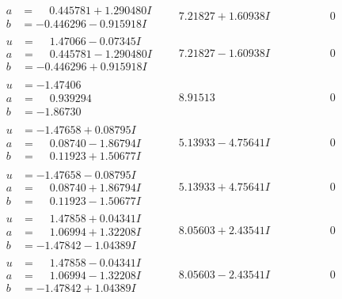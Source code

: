 \documentclass[1p]{elsarticle_modified}
\theoremstyle{definition}
\begin{document}
$$\begin{array}{c|c|c}
\begin{aligned}
a &= \phantom{-}0.445781 + 1.290480 I \\
b &= -0.446296 - 0.915918 I\end{aligned}
 & \phantom{-}7.21827 + 1.60938 I & \phantom{-0.000000 } 0 \\ \hline\begin{aligned}
u &= \phantom{-}1.47066 - 0.07345 I \\
a &= \phantom{-}0.445781 - 1.290480 I \\
b &= -0.446296 + 0.915918 I\end{aligned}
 & \phantom{-}7.21827 - 1.60938 I & \phantom{-0.000000 } 0 \\ \hline\begin{aligned}
u &= -1.47406\phantom{ +0.000000I} \\
a &= \phantom{-}0.939294\phantom{ +0.000000I} \\
b &= -1.86730\phantom{ +0.000000I}\end{aligned}
 & \phantom{-}8.91513\phantom{ +0.000000I} & \phantom{-0.000000 } 0 \\ \hline\begin{aligned}
u &= -1.47658 + 0.08795 I \\
a &= \phantom{-}0.08740 - 1.86794 I \\
b &= \phantom{-}0.11923 + 1.50677 I\end{aligned}
 & \phantom{-}5.13933 - 4.75641 I & \phantom{-0.000000 } 0 \\ \hline\begin{aligned}
u &= -1.47658 - 0.08795 I \\
a &= \phantom{-}0.08740 + 1.86794 I \\
b &= \phantom{-}0.11923 - 1.50677 I\end{aligned}
 & \phantom{-}5.13933 + 4.75641 I & \phantom{-0.000000 } 0 \\ \hline\begin{aligned}
u &= \phantom{-}1.47858 + 0.04341 I \\
a &= \phantom{-}1.06994 + 1.32208 I \\
b &= -1.47842 - 1.04389 I\end{aligned}
 & \phantom{-}8.05603 + 2.43541 I & \phantom{-0.000000 } 0 \\ \hline\begin{aligned}
u &= \phantom{-}1.47858 - 0.04341 I \\
a &= \phantom{-}1.06994 - 1.32208 I \\
b &= -1.47842 + 1.04389 I\end{aligned}
 & \phantom{-}8.05603 - 2.43541 I & \phantom{-0.000000 } 0 \\ \hline\begin{aligned}

\end{aligned}
\end{array}$$
\end{document}
